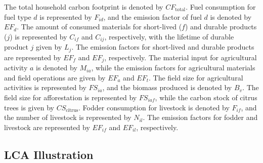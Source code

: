 \documentclass[12pt,a4paper]{article}%
\begin{document}
The total household carbon footprint is denoted by $CF_{\text{total}}$. Fuel consumption for fuel type $d$ is represented by $F_{id}$, and the emission factor of fuel $d$ is denoted by $EF_d$. The amount of consumed materials for short-lived ($f$) and durable products ($j$) is represented by $C_{if}$ and $C_{ij}$, respectively, with the lifetime of durable product $j$ given by $L_j$. The emission factors for short-lived and durable products are represented by $EF_f$ and $EF_j$, respectively. The material input for agricultural activity $a$ is denoted by $M_{ia}$, while the emission factors for agricultural materials and field operations are given by $EF_a$ and $EF_t$. The field size for agricultural activities is represented by $FS_{ia}$, and the biomass produced is denoted by $B_v$. The field size for afforestation is represented by $FS_{iaf}$, while the carbon stock of citrus trees is given by $CS_{\text{citrus}}$. Fodder consumption for livestock is denoted by $F_{if}$, and the number of livestock is represented by $N_{il}$. The emission factors for fodder and livestock are represented by $EF_{if}$ and $EF_{il}$, respectively.

\subsection{LCA Illustration}
\end{document}
